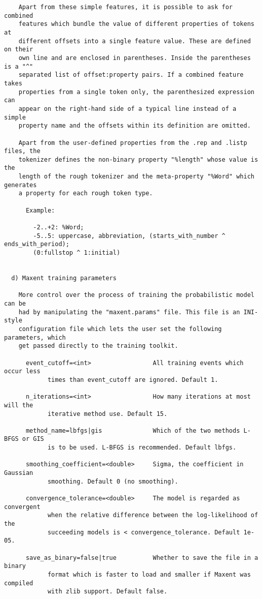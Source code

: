 \begin{tiny}
\begin{verbatim}
    Apart from these simple features, it is possible to ask for combined
    features which bundle the value of different properties of tokens at
    different offsets into a single feature value. These are defined on their
    own line and are enclosed in parentheses. Inside the parentheses is a "^"
    separated list of offset:property pairs. If a combined feature takes
    properties from a single token only, the parenthesized expression can
    appear on the right-hand side of a typical line instead of a simple
    property name and the offsets within its definition are omitted.

    Apart from the user-defined properties from the .rep and .listp files, the
    tokenizer defines the non-binary property "%length" whose value is the
    length of the rough tokenizer and the meta-property "%Word" which generates
    a property for each rough token type.

      Example:
        
        -2..+2: %Word;
        -5..5: uppercase, abbreviation, (starts_with_number ^ ends_with_period);
        (0:fullstop ^ 1:initial)
        

  d) Maxent training parameters

    More control over the process of training the probabilistic model can be
    had by manipulating the "maxent.params" file. This file is an INI-style
    configuration file which lets the user set the following parameters, which
    get passed directly to the training toolkit.

      event_cutoff=<int>                 All training events which occur less
            times than event_cutoff are ignored. Default 1.

      n_iterations=<int>                 How many iterations at most will the
            iterative method use. Default 15.

      method_name=lbfgs|gis              Which of the two methods L-BFGS or GIS
            is to be used. L-BFGS is recommended. Default lbfgs.

      smoothing_coefficient=<double>     Sigma, the coefficient in Gaussian
            smoothing. Default 0 (no smoothing).

      convergence_tolerance=<double>     The model is regarded as convergent
            when the relative difference between the log-likelihood of the
            succeeding models is < convergence_tolerance. Default 1e-05.

      save_as_binary=false|true          Whether to save the file in a binary
            format which is faster to load and smaller if Maxent was compiled
            with zlib support. Default false.


\end{verbatim}
\end{tiny}
